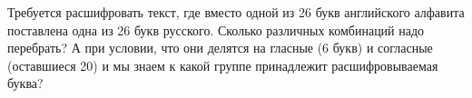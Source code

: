 \question
Требуется расшифровать текст, где вместо одной из 26 букв английского алфавита поставлена одна из 26 букв русского. Сколько различных комбинаций надо перебрать? А при условии, что они делятся на гласные (6 букв) и согласные (оставшиеся 20) и мы знаем к какой группе принадлежит расшифровываемая буква?
